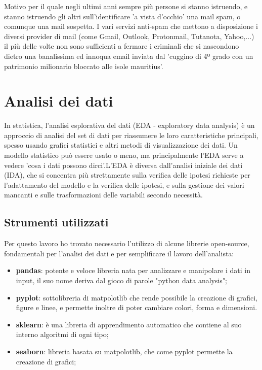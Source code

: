 \documentclass[12pt,a4paper]{article}
\begin{document}
Motivo per il quale negli ultimi anni sempre più persone si stanno istruendo, e stanno istruendo gli altri sull'identificare 'a vista d'occhio' una mail spam, o comunque una mail sospetta.
\break
I vari servizi anti-spam che mettono a disposizione i diversi provider di mail (come Gmail, Outlook, Protonmail, Tutanota, Yahoo,...) il più delle volte non sono sufficienti a fermare i criminali che si nascondono dietro una banalissima ed innoqua email inviata dal 'cuggino di 4º grado con un patrimonio milionario bloccato alle isole mauritius'.

\clearpage
\section{Analisi dei dati}
In statistica, l'analisi esplorativa del dati (EDA - exploratory data analysis) è un approccio di analisi del set di dati per riassumere le loro caratteristiche principali, spesso usando grafici statistici e altri metodi di visualizzazione dei dati. Un modello statistico può essere usato o meno, ma principalmente l'EDA serve a vedere 'cosa i dati possono dirci'.L'EDA è diversa dall'analisi iniziale dei dati (IDA), che si concentra più strettamente sulla verifica delle ipotesi richieste per l'adattamento del modello e la verifica delle ipotesi, e sulla gestione dei valori mancanti e sulle trasformazioni delle variabili secondo necessità.

\subsection{Strumenti utilizzati}
Per questo lavoro ho trovato necessario l'utilizzo di alcune librerie open-source, fondamentali per l'analisi dei dati e per semplificare il lavoro dell'analista:
\begin{itemize}
    \item \textbf{pandas}: potente e veloce libreria nata per analizzare e manipolare i dati in input, il suo nome deriva dal gioco di parole "python data analysis";
\end{itemize}

\begin{itemize}
    \item \textbf{pyplot}: sottolibreria di matpolotlib che rende possibile la creazione di grafici, figure e linee, e permette inoltre di poter cambiare colori, forma e dimensioni.
\end{itemize}
\begin{itemize}
    \item \textbf{sklearn}: è una libreria di apprendimento automatico che contiene al suo interno algoritmi di ogni tipo;
\end{itemize}
\begin{itemize}
    \item \textbf{seaborn}: libreria basata su  matpolotlib, che come pyplot permette la creazione di grafici;
\end{itemize}
\end{document}
